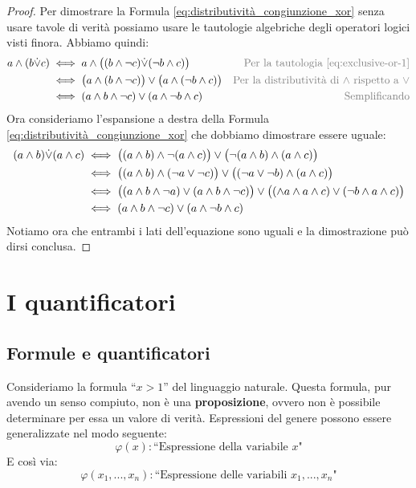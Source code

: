 \begin{proof} 
	Per dimostrare la Formula \ref{eq:distributività_congiunzione_xor} senza usare tavole di verità possiamo usare le tautologie algebriche degli operatori logici visti finora. Abbiamo quindi:
	\begin{align*}
		a \land (b \xor c) &\iff a \land \bigl((b \land \neg c ) \xor (\neg b \land c)\bigr) & \text{\textcolor{gray}{Per la tautologia \ref{eq:exclusive-or-1}}} \\
		&\iff \bigl(a \land (b \land \neg c) \bigr) \lor \bigl(a \land (\neg b \land c)\bigr) & \text{\textcolor{gray}{Per la distributività di $\land$ rispetto a $\lor$}} \\
		&\iff (a \land b \land \neg c) \lor (a \land \neg b \land c) & \text{\textcolor{gray}{Semplificando}}
	\end{align*}
	Ora consideriamo l'espansione a destra della Formula \ref{eq:distributività_congiunzione_xor} che dobbiamo dimostrare essere uguale:
	\begin{align*}
		(a \land b) {\displaystyle{\dot{\vee}}} (a \land c) &\iff \bigl((a \land b) \land \neg(a \land c)\bigr) \lor \bigl(\neg(a \land b) \land (a \land c)\bigr) \\
		&\iff \bigl((a \land b) \land (\neg a \lor \neg c)\bigr) \lor \bigl((\neg a \lor \neg b) \land (a \land c)\bigr) \\
		&\iff \bigl((a \land b \land \neg a) \lor (a \land b \land \neg c)\bigr) \lor \bigl((\land a \land a \land c) \lor (\neg b \land a \land c)\bigr) \\
		&\iff (a \land b \land \neg c) \lor (a \land \neg b \land c)
	\end{align*}
	Notiamo ora che entrambi i lati dell'equazione sono uguali e la dimostrazione può dirsi conclusa.
\end{proof}

\section{I quantificatori}

\subsection{Formule e quantificatori}
Consideriamo la formula ``$x>1$'' del linguaggio naturale. Questa formula, pur avendo un senso compiuto, non è una \textbf{proposizione}, ovvero non è possibile determinare per essa un valore di verità. Espressioni del genere possono essere generalizzate nel modo seguente: \[\varphi(x):\mbox{``Espressione della variabile $x$"}\]
E così via:
\begin{displaymath}
	\varphi(x_{1},...,x_{n}) : \mbox{``Espressione delle variabili $x_{1},...,x_{n}$"}
\end{displaymath}

